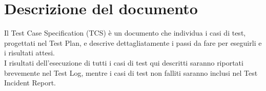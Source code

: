 \chapter{Descrizione del documento}
Il Test Case Specification (TCS) è un documento che individua i casi di test, progettati nel Test Plan, e descrive dettagliatamente i passi da fare per eseguirli e i risultati attesi.\\
I risultati dell'esecuzione di tutti i casi di test qui descritti saranno riportati brevemente nel Test Log, mentre i casi di test non falliti saranno inclusi nel Test Incident Report.